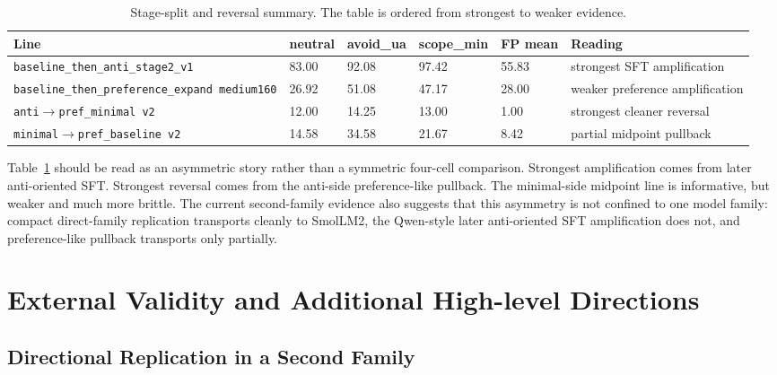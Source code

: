 \documentclass[11pt]{article}
\begin{document}
\begin{table}[t]
\centering
\caption{Stage-split and reversal summary. The table is ordered from strongest to weaker evidence.}
\label{tab:stage-and-reversal}
\begin{tabular}{p{3.7cm}p{1.2cm}p{1.2cm}p{1.3cm}p{1.5cm}p{2.3cm}}
\toprule
Line & neutral & avoid\_ua & scope\_min & FP mean & Reading \\
\midrule
\texttt{baseline\_then\_anti\_stage2\_v1} & 83.00 & 92.08 & 97.42 & 55.83 & strongest SFT amplification \\
\texttt{baseline\_then\_preference\_expand medium160} & 26.92 & 51.08 & 47.17 & 28.00 & weaker preference amplification \\
\texttt{anti$\rightarrow$pref\_minimal v2} & 12.00 & 14.25 & 13.00 & 1.00 & strongest cleaner reversal \\
\texttt{minimal$\rightarrow$pref\_baseline v2} & 14.58 & 34.58 & 21.67 & 8.42 & partial midpoint pullback \\
\bottomrule
\end{tabular}
\end{table}

Table~\ref{tab:stage-and-reversal} should be read as an asymmetric story rather than a symmetric four-cell comparison. Strongest amplification comes from later anti-oriented SFT. Strongest reversal comes from the anti-side preference-like pullback. The minimal-side midpoint line is informative, but weaker and much more brittle. The current second-family evidence also suggests that this asymmetry is not confined to one model family: compact direct-family replication transports cleanly to SmolLM2, the Qwen-style later anti-oriented SFT amplification does not, and preference-like pullback transports only partially.

\section{External Validity and Additional High-level Directions}
\label{sec:external}

\subsection{Directional Replication in a Second Family}
\end{document}
